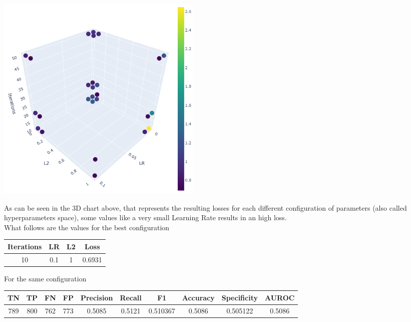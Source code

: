 \documentclass[
	letterpaper, %
	10pt, %
]{class}
\begin{document}
\begin{center}
    \includegraphics[width=10cm]{../images/3d.png}
\end{center}

As can be seen in the 3D chart above, that represents the resulting losses for each different configuration of parameters (also called hyperparameters space), some values like a very small Learning Rate results in an high loss.\\
What follows are the values for the best configuration

\begin{center}
    \begin{tabular}{ |c|c|c|c| }
        \hline
        Iterations & LR  & L2 & Loss   \\
        \hline
        10         & 0.1 & 1  & 0.6931 \\
        \hline
    \end{tabular}
\end{center}

For the same configuration

\begin{center}
    \begin{tabular}{ |c|c|c|c|c|c|c|c|c|c| }
        \hline
        TN  & TP  & FN  & FP  & Precision & Recall & F1       & Accuracy & Specificity & AUROC  \\
        \hline
        789 & 800 & 762 & 773 & 0.5085    & 0.5121 & 0.510367 & 0.5086   & 0.505122    & 0.5086 \\
        \hline
    \end{tabular}
\end{center}
\end{document}
